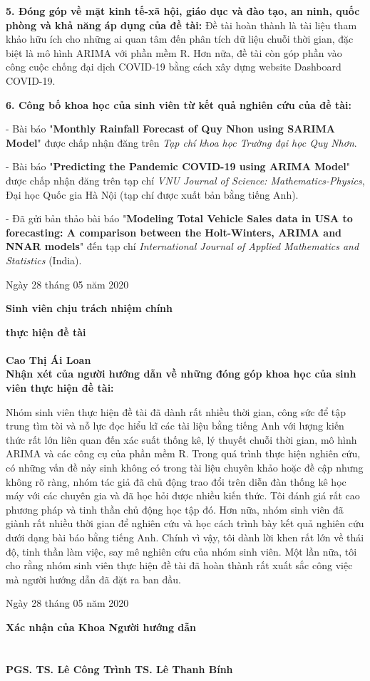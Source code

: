 \noindent 
{\bf 5. Đóng góp về mặt kinh tế-xã hội, giáo dục và đào tạo, an ninh, 
quốc phòng và khả năng áp dụng của đề tài:}
Đề tài hoàn thành là tài liệu tham khảo hữu ích cho những ai quan tâm đến phân tích dữ liệu chuỗi thời gian, đặc biệt là mô hình ARIMA với phần mềm R. Hơn nữa, đề tài còn góp phần vào công cuộc chống đại dịch COVID-19 bằng cách xây dựng website Dashboard COVID-19.

\noindent 
{\bf 6. Công bố khoa học của sinh viên từ kết quả nghiên cứu của đề tài:}

- Bài báo "\textbf{Monthly Rainfall Forecast of Quy Nhon using SARIMA Model}" được chấp nhận đăng trên \textit{Tạp chí khoa học Trường đại học Quy Nhơn}.

- Bài báo "\textbf{Predicting the Pandemic COVID-19 using ARIMA Model}" được chấp nhận đăng trên tạp chí \textit{VNU Journal of Science: Mathematics-Physics}, Đại học Quốc gia Hà Nội (tạp chí được xuất bản bằng tiếng Anh).

- Đã gửi bản thảo bài báo "\textbf{Modeling Total Vehicle Sales data in USA to forecasting: A comparison between the Holt-Winters, ARIMA and NNAR models}" đến tạp chí \textit{International Journal of Applied Mathematics and Statistics} (India).

\hfill Ngày  28 tháng 05 năm 2020 \mbox{\qquad}

\hfill {\bf Sinh viên chịu trách nhiệm chính}

\hfill {\bf thực hiện đề tài} \mbox{\qquad \qquad}
\\
\\

\hfill {\bf Cao Thị Ái Loan}\mbox{\qquad\;\;\;\;\;\;\;}
\\

\noindent
{\bf Nhận xét của người hướng dẫn về những đóng góp khoa học của sinh viên thực hiện đề tài:}

Nhóm sinh viên thực hiện đề tài đã dành rất nhiều thời gian, công sức để tập trung tìm tòi và nỗ lực đọc hiểu kĩ các tài liệu bằng tiếng Anh với lượng kiến thức rất lớn liên quan đến xác suất thống kê, lý thuyết chuỗi thời gian, mô hình ARIMA và các công cụ của phần mềm R. Trong quá trình thực hiện nghiên cứu, có những vấn đề nảy sinh không có trong tài liệu chuyên khảo hoặc đề cập nhưng không rõ ràng, nhóm tác giả đã chủ động trao đổi trên diễn đàn thống kê học máy với các chuyên gia và đã học hỏi được nhiều kiến thức. Tôi đánh giá rất cao phương pháp và tinh thần chủ động học tập đó. Hơn nữa, nhóm sinh viên đã giành rất nhiều thời gian để nghiên cứu và học cách trình bày kết quả nghiên cứu dưới dạng bài báo bằng tiếng Anh. Chính vì vậy, tôi dành lời khen rất lớn về thái độ, tinh thần làm việc, say mê nghiên cứu của nhóm sinh viên. Một lần nữa, tôi cho rằng nhóm sinh viên thực hiện đề tài đã hoàn thành rất xuất sắc công việc mà người hướng dẫn đã đặt ra ban đầu.

\hfill Ngày 28 tháng 05 năm 2020

\hfill{\bf Xác nhận của Khoa \hskip6cm  Người hướng dẫn} \mbox{\quad}
\\
\\
\\

\hfill{\bf PGS. TS. Lê Công Trình \hskip5cm  TS. Lê Thanh Bính \;} \mbox{\quad}